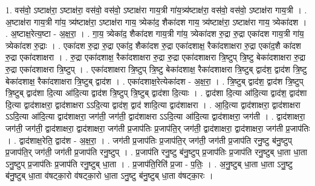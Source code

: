\documentclass[17pt]{extarticle}
\begin{document}
1. वस॑वो॒ ऽष्टाक्ष॑रा॒ ऽष्टाक्ष॑रा॒ वस॑वो॒ वस॑वो॒ ऽष्टाक्ष॑रा गाय॒त्री गा॑य॒त्र्य॑ष्टाक्ष॑रा॒ वस॑वो॒ वस॑वो॒ ऽष्टाक्ष॑रा गाय॒त्री । . अ॒ष्टाक्ष॑रा गाय॒त्री गा॑य॒ त्र्य॑ष्टाक्ष॑रा॒ ऽष्टाक्ष॑रा गाय॒ त्र्येका॑द॒ शैका॑दश 
गाय॒ त्र्य॑ष्टाक्ष॑रा॒ ऽष्टाक्ष॑रा गाय॒ त्र्येका॑दश । . अ॒ष्टाक्ष॒रेत्य॒ष्टा - अ॒क्ष॒रा॒ । . गा॒य॒ त्र्येका॑द॒ शैका॑दश गाय॒त्री गा॑य॒ त्र्येका॑दश रु॒द्रा रु॒द्रा एका॑दश गाय॒त्री गा॑य॒ त्र्येका॑दश रु॒द्राः । . एका॑दश रु॒द्रा रु॒द्रा एका॑द॒ शैका॑दश रु॒द्रा एका॑दशाक्ष॒ रैका॑दशाक्षरा रु॒द्रा एका॑द॒शै का॑दश रु॒द्रा एका॑दशाक्षरा । . रु॒द्रा एका॑दशाक्ष॒ रैका॑दशाक्षरा रु॒द्रा रु॒द्रा एका॑दशाक्षरा त्रि॒ष्टुप् त्रि॒ष्टु बेका॑दशाक्षरा रु॒द्रा रु॒द्रा एका॑दशाक्षरा त्रि॒ष्टुप् । . एका॑दशाक्षरा त्रि॒ष्टुप् त्रि॒ष्टु बेका॑दशाक्ष॒ रैका॑दशाक्षरा त्रि॒ष्टुब् द्वाद॑श॒ द्वाद॑श त्रि॒ष्टु 
बेका॑दशाक्ष॒ रैका॑दशाक्षरा त्रि॒ष्टुब् द्वाद॑श । . एका॑दशाक्ष॒रेत्येका॑दश - अ॒क्ष॒रा॒ । . त्रि॒ष्टुब् द्वाद॑श॒ द्वाद॑श त्रि॒ष्टुप् त्रि॒ष्टुब् द्वाद॑शा दि॒त्या आ॑दि॒त्या द्वाद॑श त्रि॒ष्टुप् त्रि॒ष्टुब् द्वाद॑शा दि॒त्याः । . द्वाद॑शा दि॒त्या आ॑दि॒त्या द्वाद॑श॒ द्वाद॑शा दि॒त्या द्वाद॑शाक्षरा॒ द्वाद॑शाक्षरा ऽऽदि॒त्या द्वाद॑श॒ द्वाद॑ शादि॒त्या द्वाद॑शाक्षरा । . आ॒दि॒त्या द्वाद॑शाक्षरा॒ द्वाद॑शाक्षरा ऽऽदि॒त्या आ॑दि॒त्या द्वाद॑शाक्षरा॒ जग॑ती॒ जग॑ती॒ द्वाद॑शाक्षरा ऽऽदि॒त्या आ॑दि॒त्या द्वाद॑शाक्षरा॒ जग॑ती । . द्वाद॑शाक्षरा॒ जग॑ती॒ जग॑ती॒ द्वाद॑शाक्षरा॒ द्वाद॑शाक्षरा॒ जग॑ती प्र॒जाप॑तिः प्र॒जाप॑ति॒र् जग॑ती॒ द्वाद॑शाक्षरा॒ द्वाद॑शाक्षरा॒ जग॑ती प्र॒जाप॑तिः । . द्वाद॑शाक्ष॒रेति॒ द्वाद॑श - अ॒क्ष॒रा॒ । . जग॑ती प्र॒जाप॑तिः प्र॒जाप॑ति॒र् जग॑ती॒ जग॑ती प्र॒जाप॑ति रनु॒ष्टु ब॑नु॒ष्टुप् प्र॒जाप॑ति॒र् जग॑ती॒ जग॑ती प्र॒जाप॑ति रनु॒ष्टुप् । . प्र॒जाप॑ति रनु॒ष्टु ब॑नु॒ष्टुप् प्र॒जाप॑तिः प्र॒जाप॑ति रनु॒ष्टुब् धा॒ता धा॒ता ऽनु॒ष्टुप् प्र॒जाप॑तिः प्र॒जाप॑ति रनु॒ष्टुब् धा॒ता । . प्र॒जाप॑ति॒रिति॑ प्र॒जा - प॒तिः॒ । . अ॒नु॒ष्टुब् धा॒ता धा॒ता ऽनु॒ष्टु ब॑नु॒ष्टुब् धा॒ता व॑षट्का॒रो व॑षट्का॒रो धा॒ता ऽनु॒ष्टु ब॑नु॒ष्टुब् धा॒ता व॑षट्का॒रः । \newline
\end{document}
